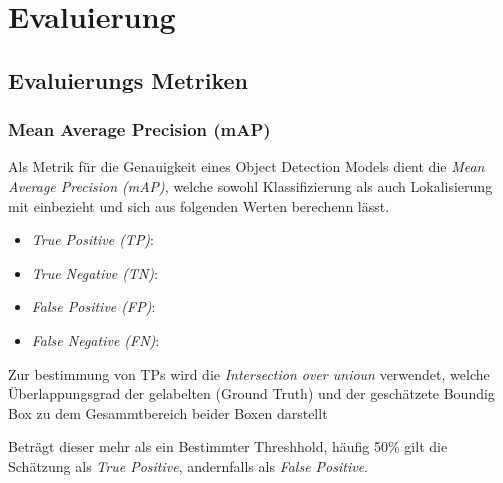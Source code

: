 \chapter{Evaluierung}\label{kap:eval}

\section{Evaluierungs Metriken}\label{sec:metricen}

\subsection*{Mean Average Precision (mAP)}

Als Metrik für die Genauigkeit eines Object Detection Models 
dient die \textit{Mean Average Precision (mAP)}, welche 
sowohl Klassifizierung als auch Lokalisierung mit einbezieht 
und sich aus folgenden Werten berechenn lässt.


\begin{itemize}
  \item \textit{True Positive (TP)}: 
  \item \textit{True Negative (TN)}: 
  \item \textit{False Positive (FP)}: 
  \item \textit{False Negative (FN)}: 
\end{itemize}

Zur bestimmung von TPs wird die \textit{Intersection over unioun}
verwendet, welche Überlappungsgrad der gelabelten (Ground Truth) und der
geschätzete Boundig Box zu dem Gesammtbereich beider Boxen darstellt 

Beträgt dieser mehr als ein Bestimmter Threshhold, häufig 50\%
gilt die Schätzung als \textit{True Positive}, andernfalls als 
\textit{False Positive}. 


\newcommand\MyBox[2]{
  \fbox{\lower0.75cm
    \vbox to 1.7cm{\vfil
      \hbox to 1.7cm{\hfil\parbox{1.4cm}{#1\\#2}\hfil}
      \vfil}%
  }%
}
\noindent
\renewcommand\arraystretch{1.5}
\setlength\tabcolsep{0pt}

